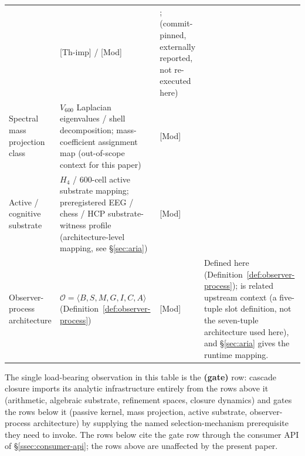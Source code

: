 \documentclass[11pt]{article}
\theoremstyle{definition}
\newcommand{\Ocal}{\mathcal{O}}
\newcommand{\Vsub}{V_{600}}
\begin{document}
\begin{longtable}{>{\raggedright\arraybackslash}p{}>{\raggedright\arraybackslash}p{}>{\raggedright\arraybackslash}p{}>{\raggedright\arraybackslash}p{}}
& \textsf{[Th-imp]} / \textsf{[Mod]}
& \cite{AriaClosureKernel}; \cite{SmartBAnomaly} (commit-pinned, externally reported, not re-executed here) \\
Spectral mass projection class
& $\Vsub$ Laplacian eigenvalues / shell decomposition; mass-coefficient assignment map (out-of-scope context for this paper)
& \textsf{[Mod]}
& \cite{SmartV, SmartVRev} \\
Active / cognitive substrate
& $H_4$ / 600-cell active substrate mapping; preregistered EEG / chess / HCP substrate-witness profile (architecture-level mapping, see \S\ref{sec:aria})
& \textsf{[Mod]}
& \cite{SmartARIAChess, ariaChessRepo} \\
Observer-process architecture
& $\Ocal = \langle B, S, M, G, I, C, A\rangle$ (Definition~\ref{def:observer-process})
& \textsf{[Mod]}
& Defined here (Definition~\ref{def:observer-process}); \cite{ObserverInstance} is related upstream context (a five-tuple slot definition, not the seven-tuple architecture used here), and \S\ref{sec:aria} gives the runtime mapping. \\
\bottomrule
\end{longtable}

The single load-bearing observation in this table is the
\textbf{(gate)} row: cascade closure imports its analytic
infrastructure entirely from the rows above it (arithmetic,
algebraic substrate, refinement spaces, closure dynamics) and
gates the rows below it (passive kernel, mass projection, active
substrate, observer-process architecture) by supplying the named
selection-mechanism prerequisite they need to invoke. The rows
below cite the gate row through the consumer API of
\S\ref{ssec:consumer-api}; the rows above are unaffected by the
present paper.



\end{document}
